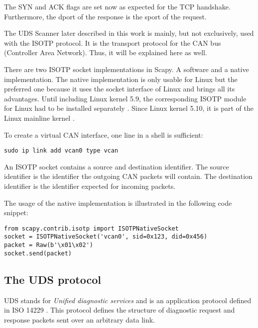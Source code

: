 The SYN and ACK flags are set now as expected for the TCP handshake. Furthermore, the dport of the response is the sport of the request.

The UDS Scanner later described in this work is mainly, but not exclusively, used with the ISOTP protocol. It is the transport protocol for the CAN bus (Controller Area Network). Thus, it will be explained here as well.

There are two ISOTP socket implementations in Scapy. A software and a native implementation. The native implementation is only usable for Linux but the preferred one because it uses the socket interface of Linux and brings all its advantages. Until including Linux kernel 5.9, the corresponding ISOTP module for Linux had to be installed separately \cite{isotp-module}. Since Linux kernel 5.10, it is part of the Linux mainline kernel \cite{isotp-commit}.

To create a virtual CAN interface, one line in a shell is sufficient:
\begin{samepage}
\begin{verbatim}
sudo ip link add vcan0 type vcan
\end{verbatim}
\end{samepage}

An ISOTP socket contains a source and destination identifier. The source identifier is the identifier the outgoing CAN packets will contain. The destination identifier is the identifier expected for incoming packets.

The usage of the native implementation is illustrated in the following code snippet:

\begin{samepage}
\begin{verbatim}
from scapy.contrib.isotp import ISOTPNativeSocket
socket = ISOTPNativeSocket('vcan0', sid=0x123, did=0x456)
packet = Raw(b'\x01\x02')
socket.send(packet)
\end{verbatim}
\end{samepage}


\subsection{The UDS protocol}

UDS stands for \emph{Unified diagnostic services} and is an application protocol defined in ISO 14229 \cite{iso14229}. This protocol defines the structure of diagnostic request and response packets sent over an arbitrary data link.


